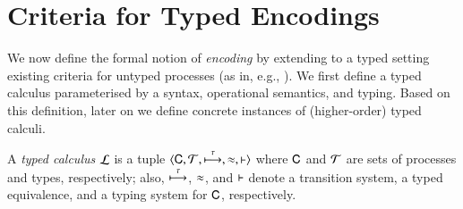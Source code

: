 \documentclass[runningheads]{llncs}
\begin{document}
{%






\section{Criteria for Typed Encodings}
\label{s:expr}
%
We now define the formal notion of \emph{encoding} by 
extending to a typed setting existing criteria for untyped processes (as in, e.g.,
\cite{Nestmann00,Palamidessi03,DBLP:conf/lics/PalamidessiSVV06,DBLP:journals/iandc/Gorla10,DBLP:conf/icalp/LanesePSS10,DBLP:journals/tcs/FuL10,DBLP:journals/corr/abs-1208-2750,DBLP:conf/esop/PetersNG13}). 
We first define a typed calculus parameterised by a syntax, operational semantics, and typing.
Based on this definition, later on we define concrete instances of (higher-order) typed calculi.


\begin{definition}\label{d:tcalculus}%
	A \emph{typed calculus} $\mathcal{L}$ is a tuple
	$\langle \mathsf{C}, \cal{T}, \stackrel{\tau}{\longmapsto}, \approx, \vdash \rangle$
	where $\mathsf{C}$ and $\cal{T}$ are sets of processes and types, 
	respectively; also, $\stackrel{\tau}{\longmapsto}$, $\approx$, and $\vdash$ 
	denote a transition system, a typed equivalence,
	and a typing system for $\mathsf{C}$, respectively. 
\end{definition}

%
%
%
%

}
\end{document}

